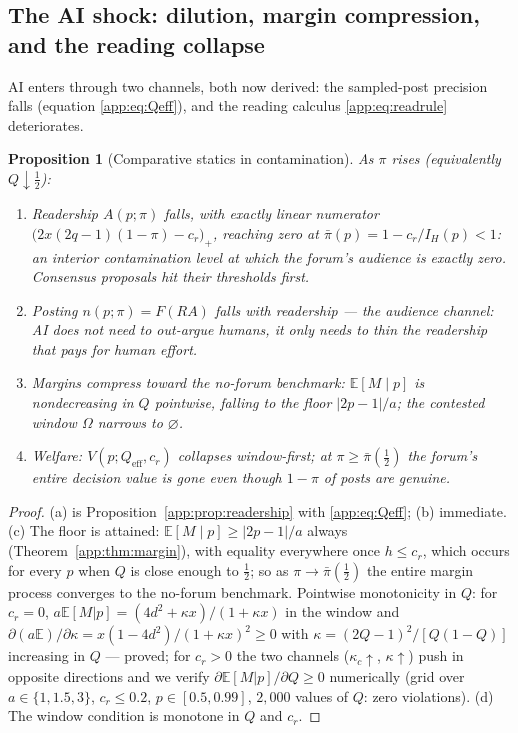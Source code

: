\documentclass[12pt]{article}
\newtheorem{proposition}{Proposition}
\newcommand{\E}{\mathbb{E}}
\begin{document}
\subsection{The AI shock: dilution, margin compression, and the reading collapse}
\label{app:sec:shock}

AI enters through two channels, both now derived: the sampled-post precision
falls (equation \eqref{app:eq:Qeff}), and the reading calculus \eqref{app:eq:readrule}
deteriorates.

\begin{proposition}[Comparative statics in contamination]\label{app:prop:shock}
As $\pi$ rises (equivalently $Q\downarrow\tfrac12$):
\begin{enumerate}[label=(\alph*),itemsep=1pt]
\item \emph{Readership} $A(p;\pi)$ falls, with exactly linear numerator
$\bigl(2x(2q-1)(1-\pi)-c_r\bigr)_+$, reaching zero at
$\bar\pi(p)=1-c_r/I_H(p)<1$: an \emph{interior} contamination level at which
the forum's audience is exactly zero. Consensus proposals hit their thresholds
first.
\item \emph{Posting} $n(p;\pi)=F(RA)$ falls with readership --- the audience
channel: AI does not need to out-argue humans, it only needs to thin the
readership that pays for human effort.
\item \emph{Margins} compress toward the no-forum benchmark: $\E[M\mid p]$ is
nondecreasing in $Q$ pointwise, falling to the floor $|2p-1|/a$; the contested
window $\Omega$ narrows to $\varnothing$.
\item \emph{Welfare}: $V(p;Q_{\mathrm{eff}},c_r)$ collapses window-first; at
$\pi\ge\bar\pi(\tfrac12)$ the forum's entire decision value is gone even though
$1-\pi$ of posts are genuine.
\end{enumerate}
\end{proposition}

\begin{proof}
(a) is Proposition~\ref{app:prop:readership} with \eqref{app:eq:Qeff}; (b) immediate.
(c) The floor is attained: $\E[M\mid p]\ge|2p-1|/a$ always
(Theorem~\ref{app:thm:margin}), with equality everywhere once $h\le c_r$, which
occurs for every $p$ when $Q$ is close enough to $\tfrac12$; so as
$\pi\to\bar\pi(\tfrac12)$ the entire margin process converges to the no-forum
benchmark. Pointwise monotonicity in $Q$: for $c_r=0$,
$a\E[M|p]=(4d^2+\kappa x)/(1+\kappa x)$ in the window and
$\partial(a\E)/\partial\kappa=x(1-4d^2)/(1+\kappa x)^2\ge0$ with
$\kappa=(2Q-1)^2/[Q(1-Q)]$ increasing in $Q$ --- proved; for $c_r>0$ the two
channels ($\kappa_c\uparrow$, $\kappa\uparrow$) push in opposite directions and
we verify $\partial\E[M|p]/\partial Q\ge0$ numerically (grid over
$a\in\{1,1.5,3\}$, $c_r\le0.2$, $p\in[0.5,0.99]$, $2{,}000$ values of $Q$:
zero violations). (d) The window condition is monotone in $Q$ and $c_r$.
\end{proof}
\end{document}
